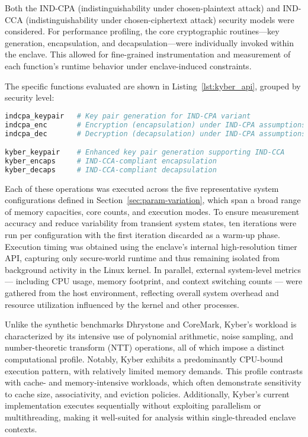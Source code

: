 Both the IND-CPA (indistinguishability under chosen-plaintext attack) and IND-CCA (indistinguishability under chosen-ciphertext attack) security models were considered. For performance profiling, the core cryptographic routines—key generation, encapsulation, and decapsulation—were individually invoked within the enclave. This allowed for fine-grained instrumentation and measurement of each function’s runtime behavior under enclave-induced constraints.

The specific functions evaluated are shown in Listing~\ref{lst:kyber_api}, grouped by security level:
\vspace{5em}
\begin{lstlisting}[language=bash,caption={Kyber cryptographic API functions},label={lst:kyber_api}]
indcpa_keypair   # Key pair generation for IND-CPA variant
indcpa_enc       # Encryption (encapsulation) under IND-CPA assumptions
indcpa_dec       # Decryption (decapsulation) under IND-CPA assumptions

kyber_keypair    # Enhanced key pair generation supporting IND-CCA
kyber_encaps     # IND-CCA-compliant encapsulation
kyber_decaps     # IND-CCA-compliant decapsulation
\end{lstlisting}
Each of these operations was executed across the five representative system configurations defined in Section~\ref{sec:param-variation}, which span a broad range of memory capacities, core counts, and execution modes. To ensure measurement accuracy and reduce variability from transient system states, ten iterations were run per configuration with the first iteration discarded as a warm-up phase. Execution timing was obtained using the enclave’s internal high-resolution timer API, capturing only secure-world runtime and thus remaining isolated from background activity in the Linux kernel. In parallel, external system-level metrics — including CPU usage, memory footprint, and context switching counts — were gathered from the host environment, reflecting overall system overhead and resource utilization influenced by the kernel and other processes.

Unlike the synthetic benchmarks Dhrystone and CoreMark, Kyber’s workload is characterized by its intensive use of polynomial arithmetic, noise sampling, and number-theoretic transform (NTT) operations, all of which impose a distinct computational profile. Notably, Kyber exhibits a predominantly CPU-bound execution pattern, with relatively limited memory demands. This profile contrasts with cache- and memory-intensive workloads, which often demonstrate sensitivity to cache size, associativity, and eviction policies. Additionally, Kyber’s current implementation executes sequentially without exploiting parallelism or multithreading, making it well-suited for analysis within single-threaded enclave contexts.

